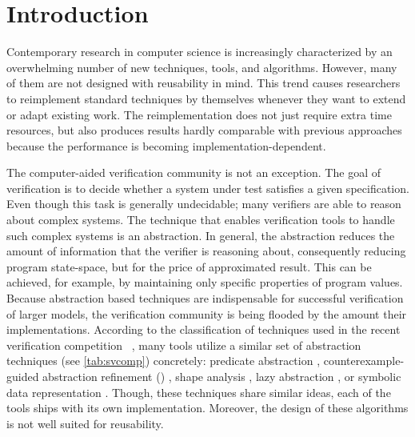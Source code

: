 \chapter{Introduction}
\label{ch:intro}


Contemporary research in computer science is increasingly characterized by
an overwhelming number of new techniques, tools, and algorithms.  However, many
of them are not designed with reusability in mind.  This trend causes
researchers to reimplement standard techniques by themselves whenever they want
to extend or adapt existing work.  The reimplementation does not just require
extra time resources, but also produces results hardly comparable with previous
approaches because the performance is becoming implementation-dependent.

The computer-aided verification community is not an exception. The goal of
verification is to decide whether a system under test satisfies a given
specification. Even though this task is generally undecidable; many verifiers
are able to reason about complex systems. The technique that enables
verification tools to handle such complex systems is an abstraction. In
general, the abstraction reduces the amount of information that the verifier is
reasoning about, consequently reducing program state-space, but for the price
of approximated result. This can be achieved, for example, by maintaining only
specific properties of program values. Because abstraction based techniques are
indispensable for successful verification of larger models, the verification
community is being flooded by the amount their implementations.  According to
the classification of techniques used in the recent verification competition
\svcomp~\cite{SVCOMP2019}, many tools utilize a similar set of abstraction
techniques (see \autoref{tab:svcomp}) concretely: predicate abstraction
\cite{Flanagan02},  coun\-ter\-example-guided abstraction refinement (\cegar)
\cite{Clarke20}, shape analysis \cite{Yang2008}, lazy abstraction
\cite{Henzinger2002}, or symbolic data representation
\cite{King76,Burch1990,Majumdar2018}. Though, these techniques share similar
ideas, each of the tools ships with its own implementation.  Moreover, the
design of these algorithms is not well suited for reusability.

